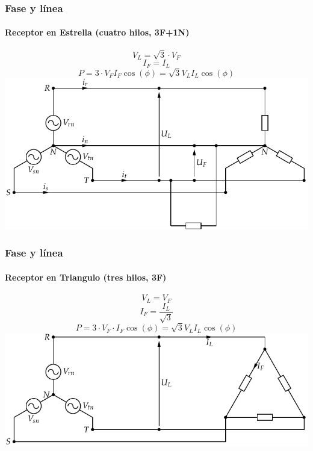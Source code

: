 \documentclass[serif, xcolor=dvipsnames]{beamer}
\begin{document}
\begin{frame}[plain]
  \frametitle{Fase y línea}


  \framesubtitle{Receptor en Estrella (cuatro hilos, 3F+1N)}
  \begin{block} {}

    \begin{center}
      \[
      V_{L}=\sqrt{3}\cdot V_{F}
      \]
      \[
      I_{F}=I_{L}
      \]
      \[
      P=3\cdot V_{F}I_{F}\cos(\phi)=\sqrt{3}V_{L}I_{L}\cos(\phi)
      \]
      \includegraphics[scale=0.75]{../figs/RedTrifasicaEstrella_CargaMonofasica}
      \par\end{center}

  \end{block}

\end{frame}
\begin{frame}[plain]
  \frametitle{Fase y línea}


  \framesubtitle{Receptor en Triangulo (tres hilos, 3F)}
  \begin{block} {}

    \begin{center}
      \[
      V_{L}=V_{F}
      \]
      \[
      I_{F}=\frac{I_{L}}{\sqrt{3}}
      \]
      \[
      P=3\cdot V_{F}\cdot I_{F}\cos(\phi)=\sqrt{3}V_{L}I_{L}\cos(\phi)
      \]
      \includegraphics[scale=0.75]{../figs/RedTrifasicaEstrella_CargaTriangulo}
      \par\end{center}

  \end{block}

\end{frame}
\end{document}
